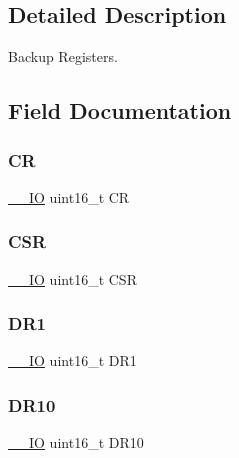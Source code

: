 \subsection{Detailed Description}
Backup Registers. 



\subsection{Field Documentation}
\mbox{\label{struct_b_k_p___type_def_a209306c97bdd3e9b6aeb9eee6a485a0e}} 
\subsubsection{\texorpdfstring{CR}{CR}}
{\footnotesize\ttfamily \mbox{\hyperlink{core__sc300_8h_aec43007d9998a0a0e01faede4133d6be}{\+\_\+\+\_\+\+IO}} uint16\+\_\+t CR}

\mbox{\label{struct_b_k_p___type_def_ab5d0eeb11a728846c639375a18225d1f}} 
\subsubsection{\texorpdfstring{CSR}{CSR}}
{\footnotesize\ttfamily \mbox{\hyperlink{core__sc300_8h_aec43007d9998a0a0e01faede4133d6be}{\+\_\+\+\_\+\+IO}} uint16\+\_\+t C\+SR}

\mbox{\label{struct_b_k_p___type_def_aa65308ed0a581d7e41f22beb05d61e97}} 
\subsubsection{\texorpdfstring{DR1}{DR1}}
{\footnotesize\ttfamily \mbox{\hyperlink{core__sc300_8h_aec43007d9998a0a0e01faede4133d6be}{\+\_\+\+\_\+\+IO}} uint16\+\_\+t D\+R1}

\mbox{\label{struct_b_k_p___type_def_a4471cf81dc53466010db99faaecb5287}} 
\subsubsection{\texorpdfstring{DR10}{DR10}}
{\footnotesize\ttfamily \mbox{\hyperlink{core__sc300_8h_aec43007d9998a0a0e01faede4133d6be}{\+\_\+\+\_\+\+IO}} uint16\+\_\+t D\+R10}

